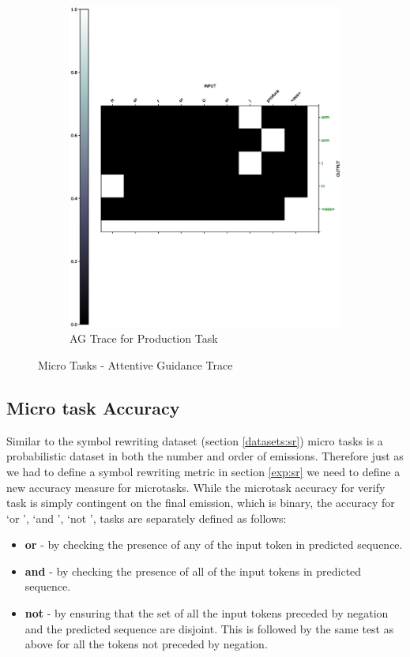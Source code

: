 \begin{figure}[ht]
\begin{subfigure}[b]{0.5\linewidth}
		\includegraphics[width=0.95\linewidth]{./figs/micro/prod-eps}
		\fi 
		\caption{AG Trace for Production Task} 
		\label{ag_prd} 
		\vspace{2ex}
	\end{subfigure}
	\caption{Micro Tasks - Attentive Guidance Trace}
	\label{mt_trace}
\end{figure}

\subsection{Micro task Accuracy}
Similar to the symbol rewriting dataset (section \ref{datasets:sr}) micro tasks is a probabilistic dataset in both the number and order of emissions. Therefore just as we had to define a symbol rewriting metric in section \ref{exp:sr} we need to define a new accuracy measure for microtasks. While the microtask accuracy for verify task is simply contingent on the final emission, which is binary, the accuracy for \lq or \rq{}, \lq and \rq{}, \lq not \rq{}, tasks are separately defined as follows:

\begin{itemize}
	\item \textbf{or} - by checking the presence of any of the input token in predicted sequence.
	\item \textbf{and} - by checking the presence of all of the input tokens in predicted sequence.
	\item \textbf{not} - by ensuring that the set of all the input tokens preceded by negation and the predicted sequence are disjoint. This is followed by the same test as above for all the tokens not preceded by negation. 
\end{itemize}

